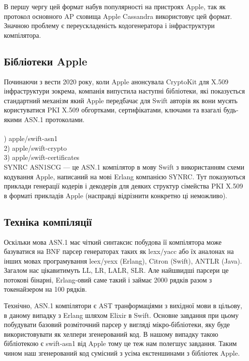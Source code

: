 В першу чергу цей формат набув популярності на пристроях Apple, так як протокол основного AP сховища Apple Cassandra використовує цей формат. Значною проблему є переускладеність кодогенератора і інфраструктури компілятора.

\subsection{Бібліотеки Apple}

Починаючи з вести 2020 року, коли Apple анонсувала CryptoKit для X.509 інфраструктури зокрема, компанія випустила наступні бібліотеки, які показується стандартний механізм який Apple передбачає для Swift авторів як вони мусять користуватися PKI X.509 обгортками, сертифікатами, ключами та взагалі будь-якими ASN.1 протоколами. \\
\\
) apple/swift-asn1\\
2) apple/swift-crypto\\
3) apple/swift-certificates\\

SYNRC ASN1SCG — це ASN.1 компілятор в мову Swift з використанням схеми кодування Apple, написаний на мові Erlang компанією SYNRC. Тут показуються приклади генерації кодерів і декодерів для деяких структур сімейства PKI X.509 в форматі прикладів Apple (насправді відрізнити конкретно ці неможливо).

\subsection{Техніка компіляції}

Оскільки мова ASN.1 має чіткий синтаксис побудова її компілятора може базуватися на BNF парсер генераторах таких як lexx/yacc або їх аналонах на інших мовах програмування leex/yexx (Erlang), Citron (Swift), ANTLR (Java). Загалом нас цікавитимуть LL, LR, LALR, SLR. Але найшвидші парсери це потокові бінарні, Erlang-овий саме такий і займає 2000 рядків разом з токенайзером на 100 рядків.

Технічно, ASN.1 компілятори є AST транформаціями з вихідної мови в цільову, в даному випадку з Erlang шляхом Elixir в Swift. Основне завдання при цьому побудувати базовий розміточний парсер у вигляді мікро-бібліотеки, яку буде використовувати як хелпери згенерований код. В нашому випадку такою бібліотекою є swift-asn1 від Apple тому це теж нам полегшує завдання. Таким чином наш згенерований код сумісний з усіма екстеншинами з бібліотек Apple.

